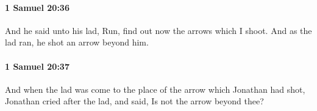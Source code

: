 		\paragraph{1 Samuel 20:36} %
			\label{1SAMUEL-20-36}

			And he said unto his lad, Run, find out now the arrows which I shoot. And as the lad ran, he shot an arrow beyond him.


		\paragraph{1 Samuel 20:37} %
			\label{1SAMUEL-20-37}

			And when the lad was come to the place of the arrow which Jonathan had shot, Jonathan cried after the lad, and said, Is not the arrow beyond thee?


